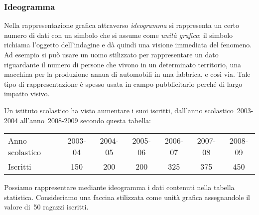 \subsubsection{Ideogramma}
Nella rappresentazione grafica attraverso \emph{ideogramma} si rappresenta 
un certo numero di dati con un simbolo che si assume come \emph{unità 
grafica};
il simbolo richiama l'oggetto dell'indagine e dà quindi una visione 
immediata del fenomeno.
Ad esempio si può usare un uomo stilizzato per rappresentare un dato 
riguardante il numero di persone che vivono in un determinato territorio,
una macchina per la produzione annua di automobili in una fabbrica, e così 
via.
Tale tipo di rappresentazione è spesso usata in campo pubblicitario perché 
di largo impatto visivo.

 \begin{esempio}

Un istituto scolastico ha visto aumentare i suoi iscritti, dall'anno 
scolastico~2003-2004 all'anno~2008-2009 secondo questa tabella:

\begin{center}
 \begin{tabular}{lcccccc}
 \toprule
 Anno scolastico & 2003-04 & 2004-05 & 2005-06 & 2006-07 & 2007-08 & 
2008-09\\
 Iscritti & 150 & 200 & 200 & 325 & 375 & 450\\
 \bottomrule
\end{tabular}
\end{center}

\noindent Possiamo rappresentare mediante ideogramma i dati contenuti nella 
tabella 
statistica.
Consideriamo una faccina stilizzata come unità grafica assegnandole il 
valore di~50 ragazzi iscritti.

%  
%  
%  
\begin{center}
 
\end{center}
 \end{esempio}

